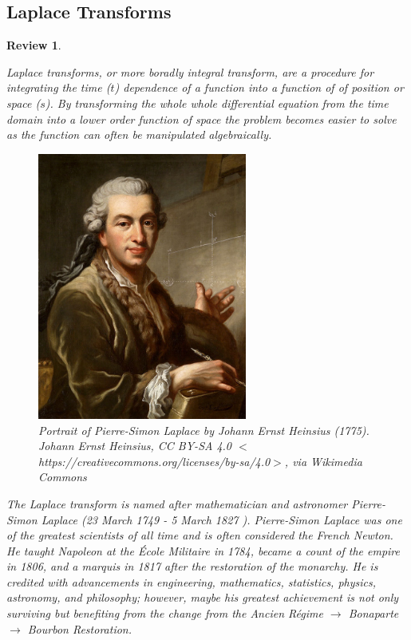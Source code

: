 \documentclass[12pt,letter]{article}
\numberwithin{ex}{section} %
\newtheorem{re}{Review}
\numberwithin{re}{section} %
\newenvironment{review}{\begin{mdframed}[middlelinewidth=2mm,roundcorner=20pt]\begin{re}\normalfont}{\end{re}\end{mdframed}}
\newcommand{\bl}[1]{\textcolor[rgb]{0.00,0.00,1.00}{#1}}
\numberwithin{equation}{section}	%
\begin{document}
\subsection{Laplace Transforms}




\begin{review}
	\label{sec:Laplace_review}
				
		Laplace transforms, or more boradly integral transform, are a procedure for integrating the time ($t$) dependence of a function into a function of of position or space ($s$). By transforming the whole whole differential equation from the time domain into a lower order function of space the problem becomes easier to solve as the function can often be manipulated algebraically. 

		\begin{figure}[H]
			\centering
			\includegraphics[width=2.71in]{../figures/Pierre-Simon_de_Laplace.jpg}
			\caption{Portrait of Pierre-Simon Laplace by Johann Ernst Heinsius (1775). \bl{Johann Ernst Heinsius, CC BY-SA 4.0 $<$https://creativecommons.org/licenses/by-sa/4.0$>$, via Wikimedia Commons}}
			\label{fig:fragility_curve}
		\end{figure}

		The Laplace transform is named after mathematician and astronomer Pierre-Simon Laplace (23 March 1749 - 5 March 1827 ). Pierre-Simon Laplace was one of the greatest scientists of all time and is often considered the French Newton. He taught Napoleon at the \'Ecole Militaire in 1784, became a count of the empire in 1806, and a marquis in 1817 after the restoration of the monarchy. He is credited with advancements in engineering, mathematics, statistics, physics, astronomy, and philosophy; however, maybe his greatest achievement is not only surviving but benefiting from the change from the Ancien R\'egime $\rightarrow$ Bonaparte $\rightarrow$ Bourbon Restoration. 


\end{review}
\end{document}
